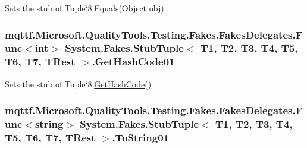 Sets the stub of Tuple`8.Equals(\-Object obj)

\hypertarget{class_system_1_1_fakes_1_1_stub_tuple_3_01_t1_00_01_t2_00_01_t3_00_01_t4_00_01_t5_00_01_t6_00_01_t7_00_01_t_rest_01_4_ac5264ace9722f3cf529164ec703d1205}{
\subsubsection[{Get\-Hash\-Code01}]{\setlength{\rightskip}{0pt plus 5cm}mqttf.\-Microsoft.\-Quality\-Tools.\-Testing.\-Fakes.\-Fakes\-Delegates.\-Func$<$int$>$ System.\-Fakes.\-Stub\-Tuple$<$ T1, T2, T3, T4, T5, T6, T7, T\-Rest $>$.Get\-Hash\-Code01}}\label{class_system_1_1_fakes_1_1_stub_tuple_3_01_t1_00_01_t2_00_01_t3_00_01_t4_00_01_t5_00_01_t6_00_01_t7_00_01_t_rest_01_4_ac5264ace9722f3cf529164ec703d1205}


Sets the stub of Tuple`8.\hyperlink{class_system_1_1_fakes_1_1_stub_tuple_3_01_t1_00_01_t2_00_01_t3_00_01_t4_00_01_t5_00_01_t6_00_01_t7_00_01_t_rest_01_4_aae6e7f5ad603618382c370ddc3ea8c81}{Get\-Hash\-Code()}

\hypertarget{class_system_1_1_fakes_1_1_stub_tuple_3_01_t1_00_01_t2_00_01_t3_00_01_t4_00_01_t5_00_01_t6_00_01_t7_00_01_t_rest_01_4_afb75db4de1d80921948f514989ef569a}{
\subsubsection[{To\-String01}]{\setlength{\rightskip}{0pt plus 5cm}mqttf.\-Microsoft.\-Quality\-Tools.\-Testing.\-Fakes.\-Fakes\-Delegates.\-Func$<$string$>$ System.\-Fakes.\-Stub\-Tuple$<$ T1, T2, T3, T4, T5, T6, T7, T\-Rest $>$.To\-String01}}\label{class_system_1_1_fakes_1_1_stub_tuple_3_01_t1_00_01_t2_00_01_t3_00_01_t4_00_01_t5_00_01_t6_00_01_t7_00_01_t_rest_01_4_afb75db4de1d80921948f514989ef569a}


